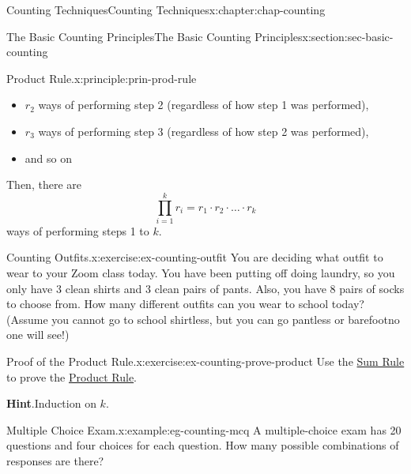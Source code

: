 \documentclass[oneside,10pt,]{book}
\newcommand{\blocktitlefont}{\relax}
\numberwithin{equation}{section}
\begin{document}
\begin{chapterptx}{Counting Techniques}{}{Counting Techniques}{}{}{x:chapter:chap-counting}
\begin{sectionptx}{The Basic Counting Principles}{}{The Basic Counting Principles}{}{}{x:section:sec-basic-counting}
\begin{principle}{Product Rule.}{}{x:principle:prin-prod-rule}
\begin{itemize}[label=\textbullet]
\item{}\(r_2\) ways of performing step 2 (regardless of how step 1 was performed),%
\item{}\(r_3\) ways of performing step 3 (regardless of how step 2 was performed),%
\item{}and so on\textellipsis{}%
\end{itemize}
Then, there are%
\begin{equation*}
\prod_{i=1}^k r_i = r_1 \cdot r_2 \cdot \ldots \cdot r_k
\end{equation*}
ways of performing steps 1 to \(k\).%
\end{principle}
\begin{inlineexercise}{Counting Outfits.}{x:exercise:ex-counting-outfit}%
You are deciding what outfit to wear to your Zoom class today. You have been putting off doing laundry, so you only have 3 clean shirts and 3 clean pairs of pants. Also, you have 8 pairs of socks to choose from. How many different outfits can you wear to school today? (Assume you cannot go to school shirtless, but you can go pantless or barefoot\textemdash{}no one will see!)%
\end{inlineexercise}
\begin{inlineexercise}{Proof of the Product Rule.}{x:exercise:ex-counting-prove-product}%
Use the \hyperref[x:principle:prin-sum-rule]{Sum Rule} to prove the \hyperref[x:principle:prin-prod-rule]{Product Rule}.%
\par\smallskip%
\noindent\textbf{\blocktitlefont Hint}.\hypertarget{g:hint:id237797}{}\quad{}Induction on \(k\).%
\end{inlineexercise}
\begin{example}{Multiple Choice Exam.}{x:example:eg-counting-mcq}%
A multiple-choice exam has 20 questions and four choices for each question. How many possible combinations of responses are there?%
\begin{sidebyside}{1}{0.35}{0.35}{0}%
\begin{sbspanel}{0.3}%

\end{sbspanel}
\end{sidebyside}
\end{example}
\end{sectionptx}
\end{chapterptx}
\end{document}
